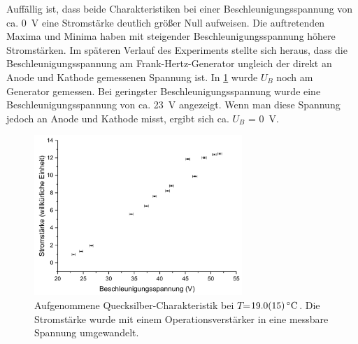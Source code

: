 \documentclass[
	a4paper,
	12pt,
	pagesize,
	ngerman
]{scrartcl}
\begin{document}
	Auffällig ist, dass beide Charakteristiken bei einer Beschleunigungsspannung von ca. \SI{0}{V} eine Stromstärke deutlich größer Null aufweisen. 
	Die auftretenden Maxima und Minima haben mit steigender Beschleunigungsspannung höhere Stromstärken.
	Im späteren Verlauf des Experiments stellte sich heraus, dass die Beschleunigungsspannung am Frank-Hertz-Generator ungleich der direkt an Anode und Kathode gemessenen Spannung ist.
	In \cref{Hg19} wurde $U_B$ noch am Generator gemessen.
	Bei geringster Beschleunigungsspannung wurde eine Beschleunigungsspannung von ca. \SI{23}{V} angezeigt.
	Wenn man diese Spannung jedoch an Anode und Kathode misst, ergibt sich ca. $U_B$ = \SI{0}{V}.
	
	
	
	
	
	
	
	
	
	
	
	
	\begin{figure}[H]
		\includegraphics[width=0.7\textwidth]{Hg19}
		\centering
		\caption{Aufgenommene Quecksilber-Charakteristik bei $T$=$\SI{19,0 +- 1,5}{\degreeCelsius}$. Die Stromstärke wurde mit einem Operationsverstärker in eine messbare Spannung umgewandelt.}
		\label{Hg19}
		\centering
	\end{figure}
\end{document}
